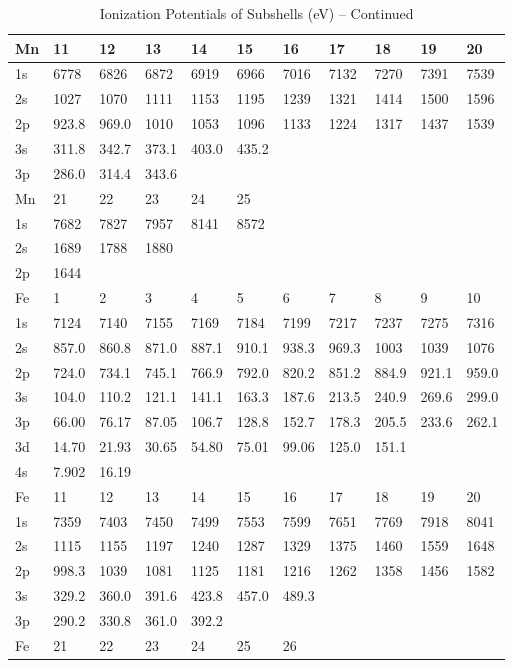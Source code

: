 \begin{table}
\begin{center}
\addtocounter{table}{-1}
\caption{Ionization Potentials of Subshells (eV) -- Continued}
\begin{tabular}{lllllllllll}
\hline
Mn&  11&  12&  13&  14&  15&  16&  17&  18&  19&  20\\
\hline
1s&  6778&  6826&  6872&  6919&  6966&
7016&  7132&  7270&  7391&  7539\\
2s&  1027&  1070&  1111&  1153&  1195&  1239&  1321&
1414&  1500&  1596\\
2p& 923.8& 969.0& 1010&  1053&  1096&  1133&  1224&  1317&  1437&
1539\\
3s& 311.8& 342.7& 373.1& 403.0& 435.2\\
3p& 286.0& 314.4& 343.6\\
\hline
Mn&  21&  22&  23&
24& 25\\
\hline
1s& 7682&  7827&  7957&  8141&  8572\\
2s&  1689&  1788&  1880\\
2p&  1644\\
\hline
Fe& 1& 2&   3&   4&   5&   6&   7&   8&   9&  10\\
\hline
1s&  7124&  7140&  7155&  7169&  7184&  7199&
7217&  7237&  7275&  7316\\
2s& 857.0& 860.8& 871.0& 887.1& 910.1& 938.3& 969.3& 1003&
1039&  1076\\
2p& 724.0& 734.1& 745.1& 766.9& 792.0& 820.2& 851.2& 884.9& 921.1& 959.0\\
3s&
104.0& 110.2& 121.1& 141.1& 163.3& 187.6& 213.5& 240.9& 269.6& 299.0\\
3p& 66.00& 76.17&
87.05& 106.7& 128.8& 152.7& 178.3& 205.5& 233.6& 262.1\\
3d& 14.70& 21.93& 30.65& 54.80&
75.01& 99.06& 125.0& 151.1\\
4s& 7.902& 16.19\\
\hline
Fe&  11&  12&  13&  14&  15&  16&  17&  18& 19&  20\\
\hline
1s&  7359&  7403&  7450&  7499&  7553&  7599&  7651&  7769&  7918&  8041\\
2s&
1115&  1155&  1197&  1240&  1287&  1329&  1375&  1460&  1559&  1648\\
2p& 998.3& 1039&
1081& 1125& 1181& 1216&  1262&  1358&  1456&  1582\\
3s& 329.2& 360.0& 391.6& 423.8&
457.0& 489.3\\
3p& 290.2& 330.8& 361.0& 392.2\\
\hline
Fe&  21&  22&  23&  24&  25&  26\\

\end{tabular}
\end{center}
\end{table}
